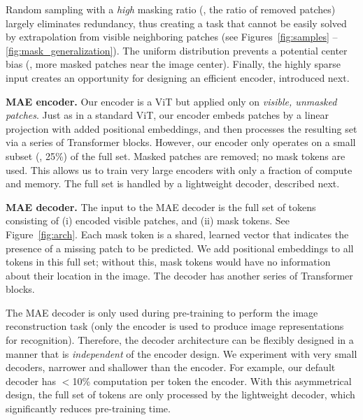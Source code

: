 \documentclass[10pt,twocolumn,letterpaper]{article}
\renewcommand{\paragraph}[1]{\vspace{1.25mm}\noindent\textbf{#1}}
\begin{document}
Random sampling with a \textit{high} masking ratio (\ie, the ratio of removed patches) largely eliminates redundancy, thus creating a task that cannot be easily solved by extrapolation from visible neighboring patches (see Figures~\ref{fig:samples} -- \ref{fig:mask_generalization}). The uniform distribution prevents a potential center bias (\ie, more masked patches near the image center). Finally, the highly sparse input creates an opportunity for designing an efficient encoder, introduced next.

\paragraph{MAE encoder.} Our encoder is a ViT \cite{Dosovitskiy2021} but applied only on \emph{visible, unmasked patches}. Just as in a standard ViT, our encoder embeds patches by a linear projection with added positional embeddings, and then processes the resulting set via a series of Transformer blocks. However, our encoder only operates on a small subset (\eg, 25\%) of the full set. Masked patches are removed; no mask tokens are used. This allows us to train very large encoders with only a fraction of compute and memory. The full set is handled by a lightweight decoder, described next.

\paragraph{MAE decoder.} The input to the MAE decoder is the full set of tokens consisting of (i) encoded visible patches, and (ii) mask tokens. See Figure~\ref{fig:arch}. Each mask token \cite{Devlin2019} is a shared, learned vector that indicates the presence of a missing patch to be predicted. We add positional embeddings to all tokens in this full set; without this, mask tokens would have no information about their location in the image. The decoder has another series of Transformer blocks.

The MAE decoder is only used during pre-training to perform the image reconstruction task (only the encoder is used to produce image representations for recognition). Therefore, the decoder architecture can be flexibly designed in a manner that is \emph{independent} of the encoder design. We experiment with very small decoders, narrower and shallower than the encoder. For example, our default decoder has $<$10\% computation per token \vs the encoder. With this asymmetrical design, the full set of tokens are only processed by the lightweight decoder, which significantly reduces pre-training time.
\end{document}
